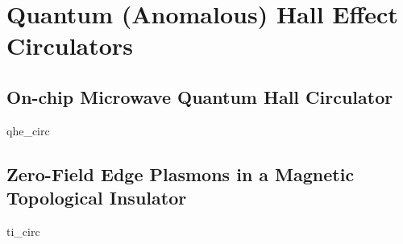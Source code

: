 \chapter{Quantum (Anomalous) Hall Effect Circulators}
\label{sec:hall}

\clearpage
\section{On-chip Microwave Quantum Hall Circulator}
\label{sec:hallcirc}
{qhe_circ}

\clearpage
\section{Zero-Field Edge Plasmons in a Magnetic Topological Insulator}
\label{sec:spinhallcirc}
{ti_circ}
